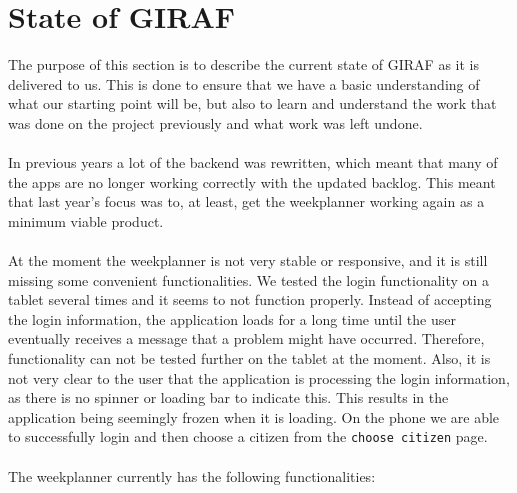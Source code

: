 \section{State of GIRAF}
The purpose of this section is to describe the current state of GIRAF as it is delivered to us.
This is done to ensure that we have a basic understanding of what our starting point will be, but also to learn and understand the work that was done on the project previously and what work was left undone.
\\\\
In previous years a lot of the backend was rewritten, which meant that many of the apps are no longer working correctly with the updated backlog.
This meant that last year's focus was to, at least, get the weekplanner working again as a minimum viable product.
\\\\
At the moment the weekplanner is not very stable or responsive, and it is still missing some convenient functionalities.
We tested the login functionality on a tablet several times and it seems to not function properly.
Instead of accepting the login information, the application loads for a long time until the user eventually receives a message that a problem might have occurred.
Therefore, functionality can not be tested further on the tablet at the moment.
Also, it is not very clear to the user that the application is processing the login information, as there is no spinner or loading bar to indicate this.
This results in the application being seemingly frozen when it is loading.
On the phone we are able to successfully login and then choose a citizen from the \texttt{choose citizen} page.
\\\\
The weekplanner currently has the following functionalities:

